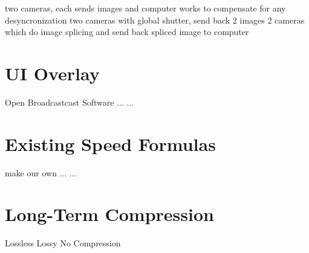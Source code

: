 \documentclass[letterpaper,10pt,onecolumn,draftclsnofoot]{IEEEtran}
\begin{document}
two cameras, each sends images and computer works to compensate for any desyncronization
two cameras with global shutter, send back 2 images
2 cameras which do image splicing and send back spliced image to computer

\section{UI Overlay}

Open Broadcastcast Software
...
...

\section{Existing Speed Formulas}

make our own
...
...

\section{Long-Term Compression}

Lossless
Lossy
No Compression



\end{document}
